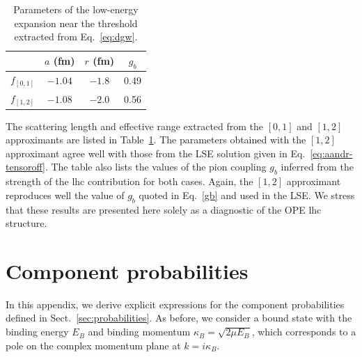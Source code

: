 \documentclass[aps,prd,showpacs,amsmath,twocolumn,superscriptaddress,floatfix,nofootinbib,notitlepage]{revtex4-2}
\begin{document}
\begin{table}[t]
 \caption{Parameters of the low-energy expansion near the threshold extracted from Eq.~\eqref{eq:dgw}.}
 \label{tab:argb}
 \begin{ruledtabular}
 \begin{tabular}{cccc}
 &$a$ (fm) & $r$ (fm) & $g_b$\\ 
 \hline
 $f_{[0,1]}$ & $-1.04$ & $-1.8$ & 0.49 \\
 $f_{[1,2]}$ & $-1.08$ & $-2.0$& 0.56
 \end{tabular}
 \end{ruledtabular}
\end{table}

The scattering length and effective range extracted from the $[0,1]$ and $[1,2]$ approximants are listed in Table~\ref{tab:argb}. The parameters obtained with the $[1,2]$ approximant agree well with those from the LSE solution given in Eq.~\eqref{eq:aandr-tensoroff}. The table also lists the values of the pion coupling $g_b$ inferred from the strength of the lhc contribution for both cases. Again, the $[1,2]$ approximant reproduces well the value of $g_b$ quoted in Eq.~\eqref{gb} and used in the LSE. We stress that these results are presented here solely as a diagnostic of the OPE lhc structure.

\section{Component probabilities}
\label{app:probabilities}

In this appendix, we derive explicit expressions for the component probabilities defined in Sect.~\ref{sec:probabilities}. As before, we consider a bound state with the binding energy $E_B$ and binding momentum $\kappa_B=\sqrt{2\mu E_B}$, which corresponds to a pole on the complex momentum plane at $k=i\kappa_B$.
\end{document}
